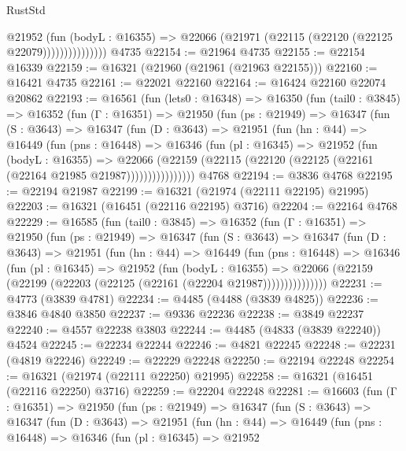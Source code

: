 \begin{lexlean}{RustStd}
\begin{coremodule}
                      @21952
                        (fun (bodyL : @16355) =>
                        @22066 (@21971 (@22115 (@22120 (@22125 @22079)))))))))))))))
    @4735
@22154 := @21964 @4735
@22155 := @22154 @16339
@22159 := @16321 (@21960 (@21961 (@21963 @22155)))
@22160 := @16421 @4735
@22161 := @22021 @22160
@22164 := @16424 @22160 @22074 @20862
@22193 := @16561
    (fun (lets0 : @16348) =>
    @16350
      (fun (tail0 : @3845) =>
      @16352
        (fun (Γ : @16351) =>
        @21950
          (fun (ps : @21949) =>
          @16347
            (fun (S : @3643) =>
            @16347
              (fun (D : @3643) =>
              @21951
                (fun (hn : @44) =>
                @16449
                  (fun (pns : @16448) =>
                  @16346
                    (fun (pl : @16345) =>
                    @21952
                      (fun (bodyL : @16355) =>
                      @22066
                        (@22159
                          (@22115 (@22120 (@22125 (@22161 (@22164 @21985 @21987))))))))))))))))
    @4768
@22194 := @3836 @4768
@22195 := @22194 @21987
@22199 := @16321 (@21974 (@22111 @22195) @21995)
@22203 := @16321 (@16451 (@22116 @22195) @3716)
@22204 := @22164 @4768
@22229 := @16585
    (fun (tail0 : @3845) =>
    @16352
      (fun (Γ : @16351) =>
      @21950
        (fun (ps : @21949) =>
        @16347
          (fun (S : @3643) =>
          @16347
            (fun (D : @3643) =>
            @21951
              (fun (hn : @44) =>
              @16449
                (fun (pns : @16448) =>
                @16346
                  (fun (pl : @16345) =>
                  @21952
                    (fun (bodyL : @16355) =>
                    @22066 (@22159 (@22199 (@22203 (@22125 (@22161 (@22204 @21987)))))))))))))))
@22231 := @4773 (@3839 @4781)
@22234 := @4485 (@4488 (@3839 @4825))
@22236 := @3846 @4840 @3850
@22237 := @9336 @22236
@22238 := @3849 @22237
@22240 := @4557 @22238 @3803
@22244 := @4485 (@4833 (@3839 @22240)) @4524
@22245 := @22234 @22244
@22246 := @4821 @22245
@22248 := @22231 (@4819 @22246)
@22249 := @22229 @22248
@22250 := @22194 @22248
@22254 := @16321 (@21974 (@22111 @22250) @21995)
@22258 := @16321 (@16451 (@22116 @22250) @3716)
@22259 := @22204 @22248
@22281 := @16603
    (fun (Γ : @16351) =>
    @21950
      (fun (ps : @21949) =>
      @16347
        (fun (S : @3643) =>
        @16347
          (fun (D : @3643) =>
          @21951
            (fun (hn : @44) =>
            @16449
              (fun (pns : @16448) =>
              @16346
                (fun (pl : @16345) =>
                @21952

\end{coremodule}
\end{lexlean}
